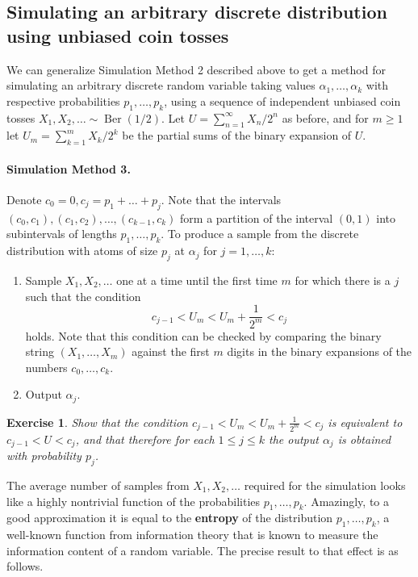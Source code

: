 \documentclass[12pt]{article}
\newtheorem{exercise}[thm]{Exercise}
\newcommand{\berdist}{\operatorname{Ber}}
\theoremstyle{example}
\begin{document}
\subsection{Simulating an arbitrary discrete distribution using unbiased coin tosses}

We can generalize Simulation Method 2 described above to get a method for simulating an arbitrary discrete random variable taking values $\alpha_1,\ldots,\alpha_k$ with respective probabilities $p_1,\ldots,p_k$, using a sequence of independent unbiased coin tosses $X_1,X_2,\ldots \sim \berdist(1/2)$. Let $U=\sum_{n=1}^\infty X_n/2^n$ as before, and for $m\ge 1$ let $U_m = \sum_{k=1}^m X_k/2^k$ be the partial sums of the binary expansion of $U$.

\paragraph{Simulation Method 3.} 
Denote $c_0 = 0, c_j = p_1+\ldots+p_j$. Note that the intervals $(c_0,c_1), (c_1,c_2),\ldots, (c_{k-1},c_k)$ form a partition of the interval $(0,1)$ into subintervals of lengths $p_1,\ldots,p_k$. To produce a sample from the discrete distribution with atoms of size $p_j$ at $\alpha_j$ for $j=1,\ldots,k$:

\begin{enumerate}
\item Sample $X_1,X_2,\ldots$ one at a time until the first time $m$ for which there is a $j$ such that the condition
$$c_{j-1} < U_m < U_m+\frac{1}{2^m} < c_j $$
holds. Note that this condition can be checked by comparing the binary string $(X_1,\ldots,X_m)$ against the first $m$ digits in the binary expansions of the numbers $c_0,\ldots,c_k$.
\item Output $\alpha_j$.
\end{enumerate}

\begin{exercise} Show that the condition $c_{j-1} < U_m < U_m+\frac{1}{2^m} < c_j $ is equivalent to $c_{j-1} < U < c_j$, and that therefore for each $1\le j\le k$ the output $\alpha_j$ is obtained with probability $p_j$.
\end{exercise}

The average number of samples from $X_1,X_2,\ldots$ required for the simulation looks like a highly nontrivial function of the probabilities $p_1,\ldots,p_k$. Amazingly, to a good approximation it is equal to the \textbf{entropy} of the distribution $p_1,\ldots,p_k$, a well-known function from information theory that is known to measure the information content of a random variable. The precise result to that effect is as follows.
\end{document}
